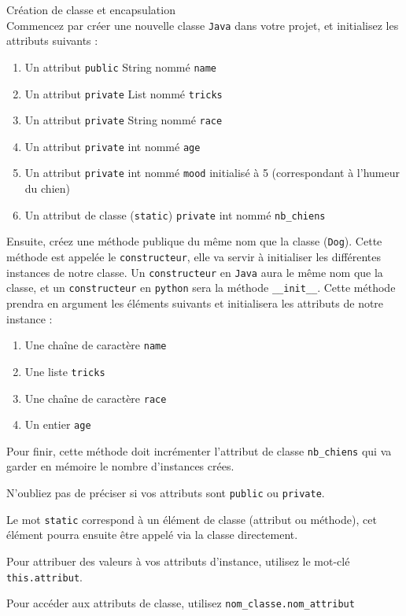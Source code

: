 \begin{Exercice}[10 minutes] Création de classe et encapsulation\\
    Commencez par créer une nouvelle classe \lstinline{Java} dans votre projet, et initialisez les attributs suivants :
    \begin{enumerate}
    \item Un attribut \lstinline{public} String nommé \lstinline{name}
    \item Un attribut \lstinline{private} List nommé \lstinline{tricks}
    \item Un attribut \lstinline{private} String nommé \lstinline{race}
    \item Un attribut \lstinline{private} int nommé \lstinline{age}
    \item Un attribut \lstinline{private} int nommé \lstinline{mood} initialisé à 5 (correspondant à l'humeur du chien)
    \item Un attribut de classe (\lstinline{static}) \lstinline{private} int nommé \lstinline{nb_chiens}
   	\end{enumerate}
   	
   	Ensuite, créez une méthode publique du même nom que la classe (\lstinline{Dog}). Cette méthode est appelée le \lstinline{constructeur}, elle va servir à initialiser les différentes instances de notre classe. Un \lstinline{constructeur} en \lstinline{Java} aura le même nom que la classe, et un \lstinline{constructeur} en \lstinline{python} sera la méthode \lstinline{__init__}. Cette méthode prendra en argument les éléments suivants et initialisera les attributs de notre instance :
   	\begin{enumerate}
    \item Une chaîne de caractère \lstinline{name}
    \item Une liste \lstinline{tricks}
    \item Une chaîne de caractère \lstinline{race}
    \item Un entier \lstinline{age}
   	\end{enumerate}
   	
   	Pour finir, cette méthode doit incrémenter l'attribut de classe \lstinline{nb_chiens} qui va garder en mémoire le nombre d'instances crées.
   	
\begin{conseil}
   N'oubliez pas de préciser si vos attributs sont \lstinline{public} ou \lstinline{private}.
   
   Le mot \lstinline{static} correspond à un élément de classe (attribut ou méthode), cet élément pourra ensuite être appelé via la classe directement.
   
   Pour attribuer des valeurs à vos attributs d'instance, utilisez le mot-clé \lstinline{this.attribut}.
   
   Pour accéder aux attributs de classe, utilisez \lstinline{nom_classe.nom_attribut}
\end{conseil}
    
\begin{solution}
	
\end{solution}
\end{Exercice}

